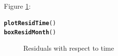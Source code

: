 \documentclass[a4paper,11pt]{article}\usepackage[]{graphicx}\usepackage[]{color}
\makeatletter
\newcommand{\hlstd}[1]{\textcolor[rgb]{0.345,0.345,0.345}{#1}}%
\newcommand{\hlkwd}[1]{\textcolor[rgb]{0.737,0.353,0.396}{\textbf{#1}}}%
\newenvironment{kframe}{%
 \def\at@end@of@kframe{}%
 \ifinner\ifhmode%
  \def\at@end@of@kframe{\end{minipage}}%
  \begin{minipage}{\columnwidth}%
 \fi\fi%
 \def\FrameCommand##1{\hskip\@totalleftmargin \hskip-\fboxsep
 \colorbox{shadecolor}{##1}\hskip-\fboxsep
     \hskip-\linewidth \hskip-\@totalleftmargin \hskip\columnwidth}%
 \MakeFramed {\advance\hsize-\width
   \@totalleftmargin\z@ \linewidth\hsize
   \@setminipage}}%
 {\par\unskip\endMakeFramed%
 \at@end@of@kframe}
\newenvironment{knitrout}{}{} %
\makeatother
\begin{document}
Figure \ref{fig:boxResidMonth}:
\begin{knitrout}
\color{fgcolor}\begin{kframe}
\begin{alltt}
\hlkwd{plotResidTime}\hlstd{()}
\hlkwd{boxResidMonth}\hlstd{()}
\end{alltt}
\end{kframe}\begin{figure}[]
\caption[Residuals with respect to time]{Residuals with respect to time\label{fig:boxResidMonth}}
\end{figure}


\end{knitrout}
\end{document}
